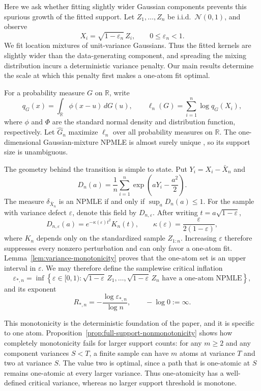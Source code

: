 \documentclass[11pt]{article}
\theoremstyle{definition}
\numberwithin{equation}{section}
\newcommand{\R}{\mathbb{R}}
\newcommand{\cN}{\mathcal{N}}
\newcommand{\wh}{\widehat}
\newcommand{\eps}{\varepsilon}
\begin{document}
Here we ask whether fitting slightly wider Gaussian components prevents this
spurious growth of the fitted support.
Let \(Z_1,\dots,Z_n\) be i.i.d.\ \(\cN(0,1)\), and observe
\begin{equation}
\label{eq:model-intro}
    X_i=\sqrt{1-\eps_n}\,Z_i,
    \qquad 0\le\eps_n<1.
\end{equation}
We fit location mixtures of unit-variance Gaussians. Thus the fitted kernels
are slightly wider than the data-generating component, and spreading the
mixing distribution incurs a deterministic variance penalty. Our main results
determine the scale at which this penalty first makes a one-atom fit optimal.

For a probability measure \(G\) on \(\R\), write
\[
    q_G(x)=\int_\R\phi(x-u)\,dG(u),
    \qquad
    \ell_n(G)=\sum_{i=1}^n\log q_G(X_i),
\]
where \(\phi\) and \(\Phi\) are the standard normal density and distribution
function, respectively. Let \(\wh G_n\) maximize
\(\ell_n\) over all probability measures on \(\R\). The one-dimensional
Gaussian-mixture NPMLE is almost surely unique
\cite{lindsay1993uniqueness}, so its support size is unambiguous.

The geometry behind the transition is simple to state. Put
\(Y_i=X_i-\bar X_n\) and
\begin{equation}
\label{eq:D-intro}
    D_n(a)=\frac1n\sum_{i=1}^n
       \exp\left(aY_i-\frac{a^2}{2}\right).
\end{equation}
The measure \(\delta_{\bar X_n}\) is an NPMLE if and only if
\(\sup_aD_n(a)\le1\). For the sample with variance defect \(\eps\), denote
this field by \(D_{n,\eps}\). After writing \(t=a\sqrt{1-\eps}\),
\[
    D_{n,\eps}(a)=e^{-\kappa(\eps)t^2}K_n(t),
    \qquad
    \kappa(\eps)=\frac{\eps}{2(1-\eps)},
\]
where \(K_n\) depends only on the standardized sample \(Z_{1:n}\). Increasing
\(\eps\) therefore suppresses every nonzero perturbation and can only favor a
one-atom fit. Lemma~\ref{lem:variance-monotonicity} proves that the one-atom
set is an upper interval in \(\eps\). We may therefore define the samplewise
critical inflation
\[
    \eps_{*,n}
    =\inf\left\{\eps\in[0,1):
       \sqrt{1-\eps}\,Z_1,\dots,\sqrt{1-\eps}\,Z_n
       \text{ have a one-atom NPMLE}\right\},
\]
and its exponent
\[
    R_{*,n}=-\frac{\log\eps_{*,n}}{\log n},
    \qquad -\log0:=\infty.
\]

This monotonicity is the deterministic foundation of the paper, and it is
specific to one atom. Proposition~\ref{prop:full-support-nonmonotonicity}
shows how completely monotonicity fails for larger support counts: for any
\(m\ge2\) and any component variances \(S<T\),
a finite sample can have \(m\) atoms at variance \(T\) and two at variance
\(S\). The value two is optimal, since a path that is one-atomic at \(S\)
remains one-atomic at every larger variance. Thus one-atomicity has a
well-defined critical variance, whereas no larger support threshold is
monotone.
\end{document}
